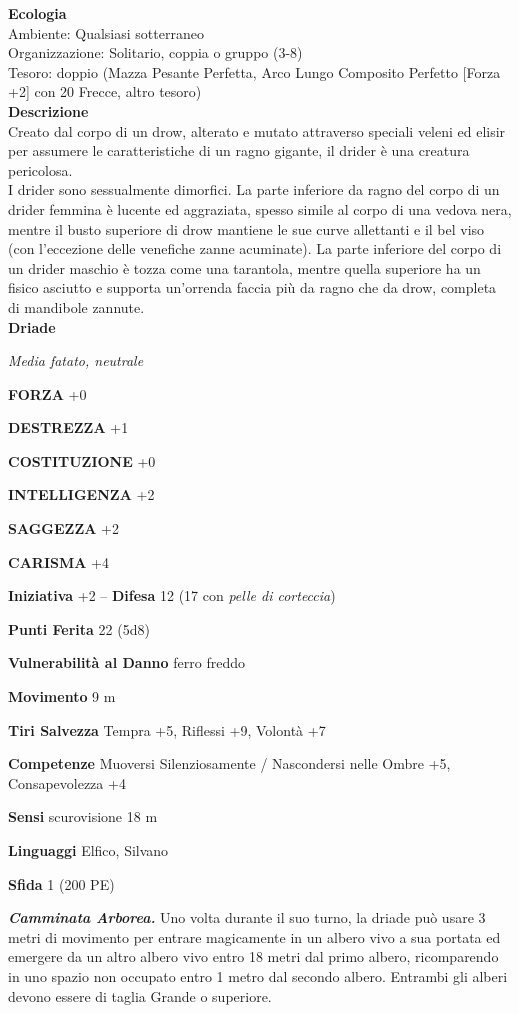 \begin{multicols}{2}
\textbf{Ecologia}\\
Ambiente: Qualsiasi sotterraneo\\
Organizzazione: Solitario, coppia o gruppo (3-8)\\
Tesoro: doppio (Mazza Pesante Perfetta, Arco Lungo Composito Perfetto [Forza +2] con 20 Frecce, altro tesoro)\\
\textbf{Descrizione}\\
Creato dal corpo di un drow, alterato e mutato attraverso speciali veleni ed elisir per assumere le caratteristiche di un ragno gigante, il drider è una creatura pericolosa.\\
I drider sono sessualmente dimorfici. La parte inferiore da ragno del corpo di un drider femmina è lucente ed aggraziata, spesso simile al corpo di una vedova nera, mentre il busto superiore di drow mantiene le sue curve allettanti e il bel viso (con l'eccezione delle venefiche zanne acuminate). La parte inferiore del corpo di un drider maschio è tozza come una tarantola, mentre quella superiore ha un fisico asciutto e supporta un'orrenda faccia più da ragno che da drow, completa di mandibole zannute.\\


\medskip{}\textbf{Driade}

\emph{Media fatato, neutrale}

\textbf{FORZA} +0

\textbf{DESTREZZA} +1

\textbf{COSTITUZIONE} +0

\textbf{INTELLIGENZA} +2

\textbf{SAGGEZZA} +2

\textbf{CARISMA} +4

\textbf{Iniziativa} +2 -- \textbf{Difesa} 12 (17 con \emph{pelle di corteccia})

\textbf{Punti Ferita} 22 (5d8)

\textbf{Vulnerabilità al Danno} ferro freddo

\textbf{Movimento} 9 m

\textbf{Tiri Salvezza} Tempra +5, Riflessi +9, Volontà +7

\textbf{Competenze} Muoversi Silenziosamente / Nascondersi nelle Ombre +5, Consapevolezza +4

\textbf{Sensi} scurovisione 18 m

\textbf{Linguaggi} Elfico, Silvano

\textbf{Sfida} 1 (200 PE)

\emph{\textbf{Camminata Arborea.}} Uno volta durante il suo turno, la driade può usare 3 metri di movimento per entrare magicamente in un albero vivo a sua portata ed emergere da un altro albero vivo entro 18 metri dal primo albero, ricomparendo in uno spazio non occupato entro 1 metro dal secondo albero. Entrambi gli alberi devono essere di taglia Grande o superiore.


\end{multicols}
